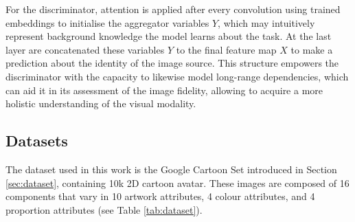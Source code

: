 \documentclass{article}
\begin{document}
	For the discriminator, attention is applied after every convolution using trained embeddings to 
	initialise the aggregator variables $Y$, which may intuitively represent background knowledge the 
	model learns about the task. At the last layer are concatenated these variables $Y$ to the final 
	feature map $X$ to make a prediction about the identity of the image source. 
	This structure empowers the discriminator with the capacity to likewise model long-range 
	dependencies, which can aid it in its assessment of the image fidelity, allowing to acquire a more 
	holistic understanding of the visual modality.
	
	\subsection{Datasets} \label{subsec:app_dataset}
	The dataset used in this work is the Google Cartoon Set \cite{cartoonset} introduced in Section 
	\ref{sec:dataset}, containing 10k 2D cartoon avatar. These images are composed of 16 components 
	that vary in 10 artwork attributes, 4 colour attributes, and 4 proportion attributes (see Table 
	\ref{tab:dataset}). 
		
\end{document}
